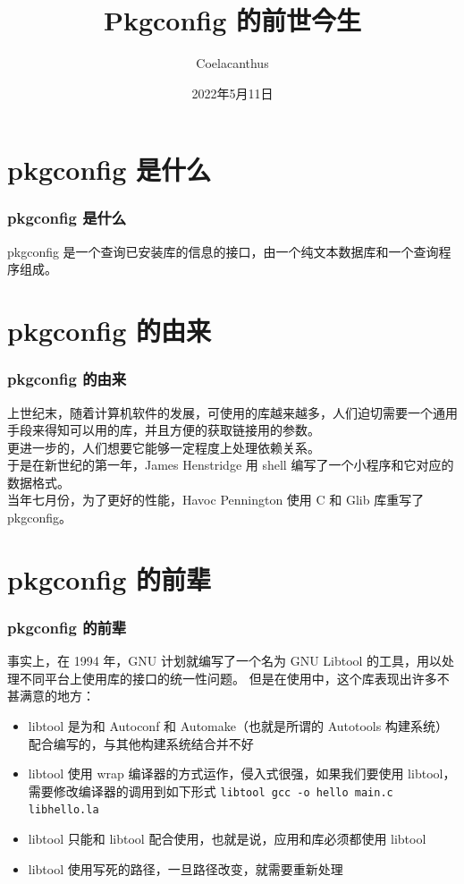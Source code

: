 \documentclass[UTF-8]{ctexbeamer}
\title{Pkgconfig 的前世今生}
\author{Coelacanthus}
\institute{PLCT Arch RISC-V 小队}
\date{2022年5月11日}
\begin{document}
\frame{\titlepage}

\section{pkgconfig 是什么}
\begin{frame}
	\frametitle{pkgconfig 是什么}
	pkgconfig 是一个查询已安装库的信息的接口，由一个纯文本数据库和一个查询程序组成。
\end{frame}

\section{pkgconfig 的由来}
\begin{frame}
	\frametitle{pkgconfig 的由来}
	上世纪末，随着计算机软件的发展，可使用的库越来越多，人们迫切需要一个通用手段来得知可以用的库，并且方便的获取链接用的参数。\\
	更进一步的，人们想要它能够一定程度上处理依赖关系。\\
	于是在新世纪的第一年，James Henstridge 用 shell 编写了一个小程序和它对应的数据格式。\\
	当年七月份，为了更好的性能，Havoc Pennington 使用 C 和 Glib 库重写了 pkgconfig。
\end{frame}

\section{pkgconfig 的前辈}
\begin{frame}[fragile]
	\frametitle{pkgconfig 的前辈}
	事实上，在 1994 年，GNU 计划就编写了一个名为 GNU Libtool 的工具，用以处理不同平台上使用库的接口的统一性问题。
	但是在使用中，这个库表现出许多不甚满意的地方：
	\begin{itemize}
		\item libtool 是为和 Autoconf 和 Automake（也就是所谓的 Autotools 构建系统）配合编写的，与其他构建系统结合并不好
		\item libtool 使用 wrap 编译器的方式运作，侵入式很强，如果我们要使用 libtool，需要修改编译器的调用到如下形式 \verb|libtool gcc -o hello main.c libhello.la|
		\item libtool 只能和 libtool 配合使用，也就是说，应用和库必须都使用 libtool
		\item libtool 使用写死的路径，一旦路径改变，就需要重新处理
	\end{itemize}
\end{frame}
\end{document}
